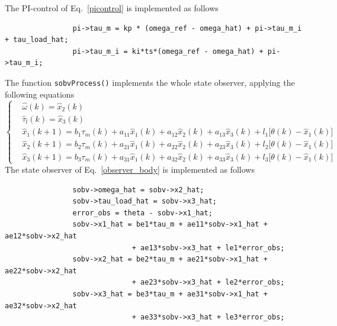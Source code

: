\documentclass[11pt,a4paper,oneside]{book}
\numberwithin{equation}{section}
\theoremstyle{it}
\theoremstyle{definition}
\begin{document}
	The PI-control of Eq.~\eqref{picontrol}   is implemented as follows
	\begin{mybox}
		{\selectfont \footnotesize \noindent
			\begin{verbatim}
				pi->tau_m = kp * (omega_ref - omega_hat) + pi->tau_m_i + tau_load_hat; 
				pi->tau_m_i = ki*ts*(omega_ref - omega_hat) + pi->tau_m_i;
		\end{verbatim}}
	\end{mybox}
	
	The function \texttt{sobvProcess()} implements the whole state observer, applying the following equations
	\begin{equation}\label{observer_body}
		\left\lbrace \begin{aligned}
			&\hat{\omega}(k) = \hat{x}_2(k) \\[6pt]		
			&\hat{\tau}_l(k) = \hat{x}_3(k) \\[6pt]
			&\hat{x}_1(k+1) = b_1\tau_m(k) + a_{11}\hat{x}_1(k) + a_{12}\hat{x}_2(k) + a_{13}\hat{x}_3(k) + l_1\Big[\theta(k)-\hat{x}_1(k)\Big] \\[6pt]
			&\hat{x}_2(k+1) = b_2\tau_m(k) + a_{21}\hat{x}_1(k) + a_{22}\hat{x}_2(k) + a_{23}\hat{x}_3(k) + l_2\Big[\theta(k)-\hat{x}_1(k)\Big] \\[6pt]
			&\hat{x}_3(k+1) = b_3\tau_m(k) + a_{31}\hat{x}_1(k) + a_{32}\hat{x}_2(k) + a_{33}\hat{x}_3(k) + l_3\Big[\theta(k)-\hat{x}_1(k)\Big]
		\end{aligned}\right. 
	\end{equation}
	The state observer of Eq.~\ref{observer_body} is implemented as follows
	\begin{mybox}
		{\selectfont \footnotesize \noindent
			\begin{verbatim}
				sobv->omega_hat = sobv->x2_hat;
				sobv->tau_load_hat = sobv->x3_hat;
				error_obs = theta - sobv->x1_hat;	
				sobv->x1_hat = be1*tau_m + ae11*sobv->x1_hat + ae12*sobv->x2_hat 
				              + ae13*sobv->x3_hat + le1*error_obs;	
				sobv->x2_hat = be2*tau_m + ae21*sobv->x1_hat + ae22*sobv->x2_hat 
				              + ae23*sobv->x3_hat + le2*error_obs;	
				sobv->x3_hat = be3*tau_m + ae31*sobv->x1_hat + ae32*sobv->x2_hat 
				              + ae33*sobv->x3_hat + le3*error_obs;
		\end{verbatim}}
	\end{mybox}
	
\end{document}
